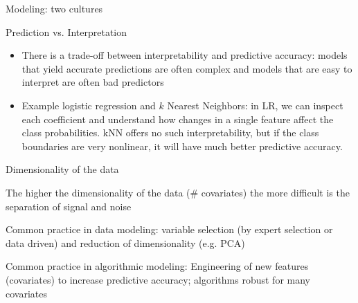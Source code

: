 \begin{vbframe}{Modeling: two cultures}
\end{vbframe}

\begin{vbframe}{Prediction vs. Interpretation}
\vspace{1.5cm}
\begin{center}
\end{center}

\framebreak

\begin{itemize}
  \item There is a trade-off between interpretability and predictive accuracy: models that yield accurate predictions are often complex and models that are easy to interpret are often bad predictors
  \lz
  \item Example logistic regression and $k$ Nearest Neighbors: in LR, we can inspect each coefficient and understand how changes in a single feature affect the class probabilities. kNN offers no such interpretability, but if the class boundaries are very nonlinear, it will have much better predictive accuracy.
\end{itemize}

\end{vbframe}

\begin{frame}{Dimensionality of the data}
\begin{blocki}{}
  \item The higher the dimensionality of the data (\# covariates) the more difficult is the separation of signal and noise
  \item Common practice in data modeling: variable selection (by expert selection or data driven) and reduction of dimensionality (e.g. PCA)
  \item Common practice in algorithmic modeling: Engineering of new features (covariates) to increase predictive accuracy; algorithms robust for many covariates
\end{blocki}

\end{frame}


